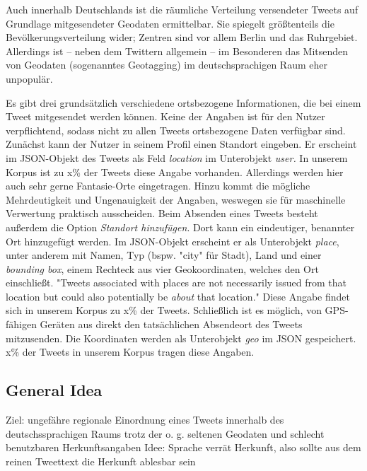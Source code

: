 \documentclass[../Main.tex]{subfiles}
\begin{document}
Auch innerhalb Deutschlands ist die räumliche Verteilung versendeter Tweets auf Grundlage mitgesendeter Geodaten ermittelbar. Sie spiegelt größtenteils die Bevölkerungsverteilung wider; Zentren sind vor allem Berlin und das Ruhrgebiet. Allerdings ist -- neben dem Twittern allgemein -- im Besonderen das Mitsenden von Geodaten (sogenanntes Geotagging) im deutschsprachigen Raum eher unpopulär.

Es gibt drei grundsätzlich verschiedene ortsbezogene Informationen, die bei einem Tweet mitgesendet werden können. Keine der Angaben ist für den Nutzer verpflichtend, sodass nicht zu allen Tweets ortsbezogene Daten verfügbar sind.
Zunächst kann der Nutzer in seinem Profil einen Standort eingeben. Er erscheint im JSON-Objekt des Tweets als Feld \textit{location} im Unterobjekt \textit{user.} In unserem Korpus ist zu x\% der Tweets diese Angabe vorhanden. Allerdings werden hier auch sehr gerne Fantasie-Orte eingetragen. Hinzu kommt die mögliche Mehrdeutigkeit und Ungenauigkeit der Angaben, weswegen sie für maschinelle Verwertung praktisch ausscheiden.
Beim Absenden eines Tweets besteht außerdem die Option \textit{Standort hinzufügen}. Dort kann ein eindeutiger, benannter Ort hinzugefügt werden. Im JSON-Objekt erscheint er als Unterobjekt \textit{place}, unter anderem mit Namen, Typ (bspw. "city" für Stadt), Land und einer \textit{bounding box}, einem Rechteck aus vier Geokoordinaten, welches den Ort einschließt.
"Tweets associated with places are not necessarily issued from that location but could also potentially be \textit{about} that location."
Diese Angabe findet sich in unserem Korpus zu x\% der Tweets.
Schließlich ist es möglich, von GPS-fähigen Geräten aus direkt den tatsächlichen Absendeort des Tweets mitzusenden. Die Koordinaten werden als Unterobjekt \textit{geo} im JSON gespeichert. x\% der Tweets in unserem Korpus tragen diese Angaben.

\subsection{General Idea}
Ziel: ungefähre regionale Einordnung eines Tweets innerhalb des deutschssprachigen Raums trotz der o. g. seltenen Geodaten und schlecht benutzbaren Herkunftsangaben %
Idee: Sprache verrät Herkunft, also sollte aus dem reinen Tweettext die Herkunft ablesbar sein %
\end{document}
